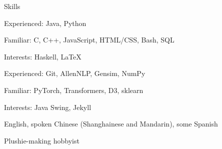 
\begin{rubric}{Skills}
    \par Experienced: Java, Python
    \par Familiar: C, C++, JavaScript, HTML/CSS, Bash, SQL
    \par Interests: Haskell, \LaTeX
{}
    \par Experienced: Git, AllenNLP, Gensim, NumPy
    \par Familiar: PyTorch, Transformers, D3, sklearn
    \par Interests: Java Swing, Jekyll
    \par English, spoken Chinese (Shanghainese and Mandarin), some Spanish
\entry*[Misc.]
    \par Plushie-making hobbyist
\end{rubric}
